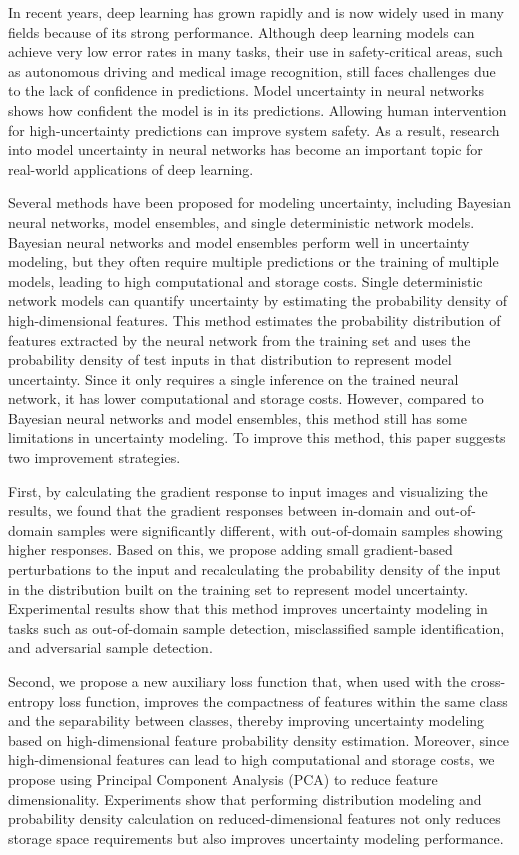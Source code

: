 \documentclass[type=master,twoside]{fduthesis}
\begin{document}
\begin{abstract*}
In recent years, deep learning has grown rapidly and is now widely used in many fields because of its strong performance. Although deep learning models can achieve very low error rates in many tasks, their use in safety-critical areas, such as autonomous driving and medical image recognition, still faces challenges due to the lack of confidence in predictions. Model uncertainty in neural networks shows how confident the model is in its predictions. Allowing human intervention for high-uncertainty predictions can improve system safety. As a result, research into model uncertainty in neural networks has become an important topic for real-world applications of deep learning.

Several methods have been proposed for modeling uncertainty, including Bayesian neural networks, model ensembles, and single deterministic network models. Bayesian neural networks and model ensembles perform well in uncertainty modeling, but they often require multiple predictions or the training of multiple models, leading to high computational and storage costs. Single deterministic network models can quantify uncertainty by estimating the probability density of high-dimensional features. This method estimates the probability distribution of features extracted by the neural network from the training set and uses the probability density of test inputs in that distribution to represent model uncertainty. Since it only requires a single inference on the trained neural network, it has lower computational and storage costs. However, compared to Bayesian neural networks and model ensembles, this method still has some limitations in uncertainty modeling. To improve this method, this paper suggests two improvement strategies.

First, by calculating the gradient response to input images and visualizing the results, we found that the gradient responses between in-domain and out-of-domain samples were significantly different, with out-of-domain samples showing higher responses. Based on this, we propose adding small gradient-based perturbations to the input and recalculating the probability density of the input in the distribution built on the training set to represent model uncertainty. Experimental results show that this method improves uncertainty modeling in tasks such as out-of-domain sample detection, misclassified sample identification, and adversarial sample detection.

Second, we propose a new auxiliary loss function that, when used with the cross-entropy loss function, improves the compactness of features within the same class and the separability between classes, thereby improving uncertainty modeling based on high-dimensional feature probability density estimation. Moreover, since high-dimensional features can lead to high computational and storage costs, we propose using Principal Component Analysis (PCA) to reduce feature dimensionality. Experiments show that performing distribution modeling and probability density calculation on reduced-dimensional features not only reduces storage space requirements but also improves uncertainty modeling performance.


\end{abstract*}
\end{document}
